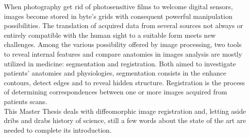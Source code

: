 When photography get rid of photosensitive films to welcome digital sensors, images become stored in byte's grids with consequent powerful manipulation possibilities. The translation of acquired data from several sources not always or entirely compatible with the human sight to a suitable form meets new challenges.
Among the various possibility offered by image processing, two tools to reveal internal features and compare anatomies in images analysis are mostly utilized in medicine: segmentation and registration.
Both aimed to investigate patients' anatomies and physiologies, segmentation consists in the enhance contours, detect edges and to reveal hidden structure. Registration is the process of determining correspondences between one or more images acquired from patients scans.\\
This Master Thesis deals with diffeomorphic image registration and, letting aside dribs and drabs history of science, still a few words about the state of the art are needed to complete its introduction.

